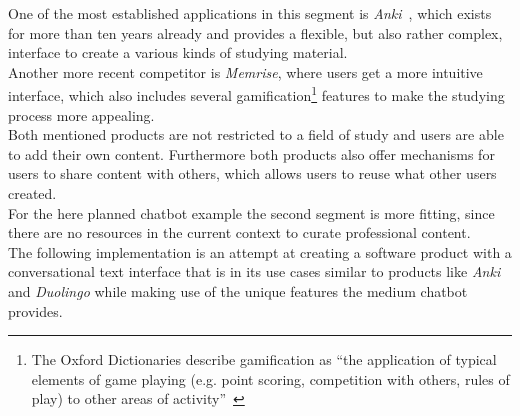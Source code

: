 One of the most established applications in this segment is \emph{Anki}~\cite{lifehacker}, which exists for more than ten years already and provides a flexible, but also rather complex, interface to create a various kinds of studying material.
\\
Another more recent competitor is \emph{Memrise}, where users get a more intuitive interface, which also includes several gamification\footnote{The Oxford Dictionaries describe gamification as ``the application of typical elements of game playing (e.g. point scoring, competition with others, rules of play) to other areas of activity''~\cite{oxfordgamification}} features to make the studying process more appealing.
\\

Both mentioned products are not restricted to a field of study and users are able to add their own content.
Furthermore both products also offer mechanisms for users to share content with others, which allows users to reuse what other users created.
\\

For the here planned chatbot example the second segment is more fitting, since there are no resources in the current context to curate professional content.
\\
The following implementation is an attempt at creating a software product with a conversational text interface that is in its use cases similar to products like \emph{Anki} and \emph{Duolingo} while making use of the unique features the medium chatbot provides.
